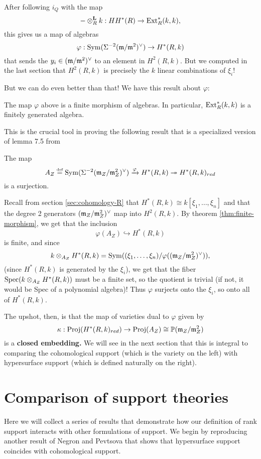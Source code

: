 \documentclass [11pt, proquest] {uwthesis}[2020/02/24]
\begin{document}
    After following $i_Q$ with the map \cite[eq. 10]{negron-pevtsovaII}
    \[-\otimes_R^\textbf{L}k:HH^\ast(R)\to \operatorname{Ext}_R^\ast(k,k),\]
    this gives us a map of algebras
    \[\varphi:\operatorname{Sym}(\Sigma^{-2}(\mathfrak{m}/\mathfrak{m}^2)^\vee)\to H^\ast(R,k)\]
    that sends the $y_i\in(\mathfrak{m}/\mathfrak{m}^2)^\vee$ to an element in $H^2(R,k).$ But we computed in the last section that $H^2(R,k)$ is precisely the $k$ linear combinations of $\xi_i!$ 
    
    But we can do even better than that! We have this result about $\varphi:$
    \begin{thm}\label{thm:finite-morphism}
        The map $\varphi$ above is a finite morphism of algebras. In particular, $\operatorname{Ext}_R^\ast(k,k)$ is a finitely generated algebra.
    \end{thm}
    This is the crucial tool in proving the following result that is a specialized version of lemma 7.5 from \cite{negron-pevtsovaII}
    \begin{lem}
        The map 
        \[A_Z\stackrel{\text{\tiny def}}{=}\operatorname{Sym}(\Sigma^{-2}(\mathfrak{m}_Z/\mathfrak{m}_Z^2)^\vee)\xrightarrow{\varphi} H^\ast(R,k)\twoheadrightarrow H^\ast(R,k)_{red}\]
        is a surjection.
    \end{lem}
    \begin{prf}
        Recall from section \ref{sec:cohomology-R} that $H^\ast(R,k)\cong k[\xi_1,\dots,\xi_n]$ and that the degree 2 generators $(\mathfrak{m}_Z/\mathfrak{m}_Z^2)^\vee$ map into $H^2(R,k).$ By theorem \ref{thm:finite-morphism}, we get that the inclusion
        \[\varphi(A_Z)\hookrightarrow H^\ast(R,k)\]
        is finite, and since 
        \[k\otimes_{A_Z}H^\ast(R,k)=\operatorname{Sym}((\xi_1,\dots,\xi_n)/\varphi((\mathfrak{m}_Z/\mathfrak{m}_Z^2)^\vee)),\]
        (since $H^\ast(R,k)$ is generated by the $\xi_i$), we get that the fiber $\operatorname{Spec}(k\otimes_{A_Z}H^\ast(R,k))$ must be a finite set, so the quotient is trivial (if not, it would be Spec of a polynomial algebra)! Thus $\varphi$ surjects onto the $\xi_i$, so onto all of $H^\ast(R,k).$
    \end{prf}
    
    The upshot, then, is that the map of varieties dual to $\varphi$ given by 
    \[\kappa:\operatorname{Proj}(H^\ast(R,k)_{red})\to \operatorname{Proj}(A_Z)\cong \mathbb{P}(\mathfrak{m}_Z/\mathfrak{m}_Z^2)\]
    is a \textbf{closed embedding.} We will see in the next section that this is integral to comparing the cohomological support (which is the variety on the left) with hypersurface support (which is defined naturally on the right).

\section{Comparison of support theories}
    Here we will collect a series of results that demonstrate how our definition of rank support interacts with other formulations of support. We begin by reproducing another result of Negron and Pevtsova that shows that hypersurface support coincides with cohomological support.
    
\end{document}
